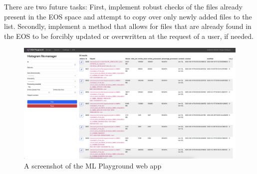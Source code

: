There are two future tasks: First, implement robust checks of the files already present in the EOS space and attempt to copy over only newly added files to the list.
Secondly, implement a method that allows for files that are already found in the EOS to be forcibly updated or overwritten at the request of a user, if needed.

\begin{figure}
	\centering
	\includegraphics*[width=\linewidth,trim = 1cm 5.2in 13.6in 0]{Images/MLP.png}
	\caption{A screenshot of the ML Playground web app}
	\label{fig:MLplayground}
\end{figure}
